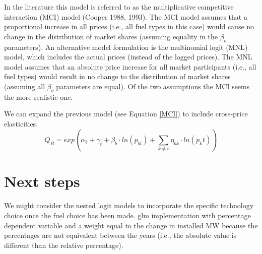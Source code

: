 \documentclass[10pt]{amsart}
\begin{document}
In the literature this model is referred to as the multiplicative competitive interaction (MCI) model \parencite{}(Cooper 1988, 1993).
The MCI model assumes that a proportional increase in all prices (i.e., all fuel types in this case) would cause no change in the distribution of market shares (assuming equality in the $\beta_b$ parameters). 
An alternative model formulation is the multinomial logit (MNL) model, which includes the actual prices (instead of the logged prices).
The MNL model assumes that an absolute price increase for all market participants (i.e., all fuel types) would result in no change to the distribution of market shares (assuming all $\beta_b$ parameters are equal). 
Of the two assumptions the MCI seems the more realistic one. 

We can expand the previous model (see Equation \ref{MCI}) to include cross-price elasticities. 
\begin{equation} \label{MCI_2}
Q_B = exp\left(\alpha_{b} + \gamma_{t} + \beta_b \cdot ln(p_{bt}) + \sum_{k \neq b} \eta_{bk}\cdot ln(p_kt)\right)
\end{equation}


\section{Next steps}
We might consider the nested logit models to incorporate the specific technology choice once the fuel choice has been made. 
glm implementation with percentage dependent variable and a weight equal to the change in installed MW because the percentages are not equivalent between the years (i.e., the absolute value is different than the relative percentage). 
\end{document}
